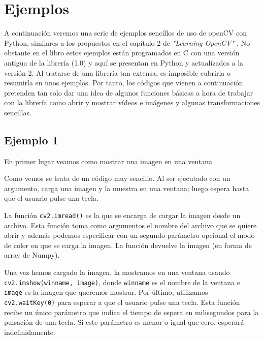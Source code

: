 \documentclass[a4paper,openright, 12pt]{book}
\begin{document}
\section{Ejemplos}
A continuación veremos una serie de ejemplos sencillos de uso de openCV con Python, similares a los propuestos en el capítulo 2 de \textit{"Learning OpenCV" \cite{oreilly}}. No obstante en el libro estos ejemplos están programados en C con una versión antigua de la librería (1.0) y aquí se presentan en Python y actualizados a la versión 2. Al tratarse de una librería tan extensa, es imposible cubrirla o resumirla en unos ejemplos. Por tanto, los códigos que vienen a continuación pretenden tan solo dar una idea de algunos funciones básicas a hora de trabajar con la librería como abrir y mostrar vídeos e imágenes y algunas transformaciones sencillas.
\subsection*{Ejemplo 1}
En primer lugar veamos como mostrar una imagen en una ventana

Como vemos se trata de un código muy sencillo. Al ser ejecutado con un argumento, carga una imagen y la muestra en una ventana; luego espera hasta que el usuario pulse una tecla.

La función \lstinline|cv2.imread()| es la que se encarga de cargar la imagen desde un archivo.  Esta función toma como argumentos el nombre del archivo que se quiere abrir y además podemos especificar con un segundo parámetro opcional el modo de color en que se carga la imagen. La función devuelve la imagen (en forma de array de Numpy).


Una vez hemos cargado la imagen, la mostramos en una ventana usando \lstinline|cv2.imshow(winname, image)|, donde \lstinline|winname| es el nombre de la ventana e \lstinline|image| es la imagen que queremos mostrar.
Por último, utilizamos \lstinline|cv2.waitKey(0)| para esperar a que el usuario pulse una tecla. Esta función recibe un único parámetro que indica el tiempo de espera en milisegundos para la pulsación de una tecla. Si este parámetro es menor o igual que cero, esperará indefinidamente.
\end{document}
